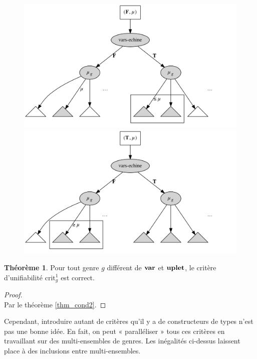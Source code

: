 \documentclass[a4paper]{report}
\newenvironment{preuve} 
	{\begin{proof}~\\} 
	{\end{proof}}
\theoremstyle{definition}
\newtheorem{theoreme}{Théorème}
\begin{document}
\begin{figure}[h]
	\begin{center}
		\includegraphics[scale=0.13]{graphs/crit2_1}
		\includegraphics[scale=0.13]{graphs/crit2_2}
	\end{center}
	\caption{\label{fig_crit2}}
\end{figure}

\begin{theoreme} \label{thm_crit2g}
	Pour tout genre $g$ différent de $\bold{var}$ et $\bold{uplet}$, le critère d'unifiabilité $\mathrm{crit}^1_g$ est correct.
\end{theoreme}

\begin{preuve}
	Par le théorème \ref{thm_cond2}.
\end{preuve}

Cependant, introduire autant de critères qu'il y a de constructeurs de types n'est pas une bonne idée. En fait, on peut « paralléliser » tous ces critères en travaillant sur des multi-ensembles de genres. Les inégalités ci-dessus laissent place à des inclusions entre multi-ensembles.
\end{document}
